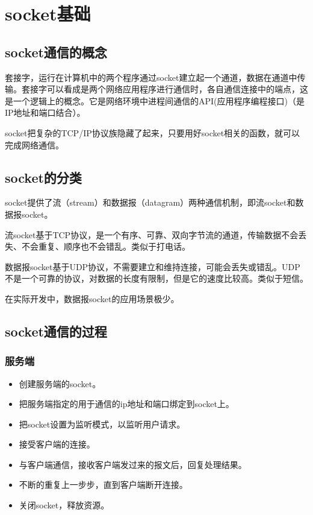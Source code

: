 \documentclass[UTF8]{article}%
\begin{document}
\section{socket基础}

\subsection{socket通信的概念}

套接字，运行在计算机中的两个程序通过socket建立起一个通道，数据在通道中传输。套接字可以看成是两个网络应用程序进行通信时，各自通信连接中的端点，这是一个逻辑上的概念。它是网络环境中进程间通信的API(应用程序编程接口)（是IP地址和端口结合）。

socket把复杂的TCP/IP协议族隐藏了起来，只要用好socket相关的函数，就可以完成网络通信。

\subsection{socket的分类}

socket提供了流（stream）和数据报（datagram）两种通信机制，即流socket和数据报socket。

流socket基于TCP协议，是一个有序、可靠、双向字节流的通道，传输数据不会丢失、不会重复、顺序也不会错乱。类似于打电话。

数据报socket基于UDP协议，不需要建立和维持连接，可能会丢失或错乱。UDP不是一个可靠的协议，对数据的长度有限制，但是它的速度比较高。类似于短信。

在实际开发中，数据报socket的应用场景极少。

\subsection{socket通信的过程}

\subsubsection{服务端}

\begin{itemize}
    \item 创建服务端的socket。
    \item 把服务端指定的用于通信的ip地址和端口绑定到socket上。
    \item 把socket设置为监听模式，以监听用户请求。
    \item 接受客户端的连接。
    \item 与客户端通信，接收客户端发过来的报文后，回复处理结果。
    \item 不断的重复上一步步，直到客户端断开连接。
    \item 关闭socket，释放资源。
\end{itemize}
\end{document}
